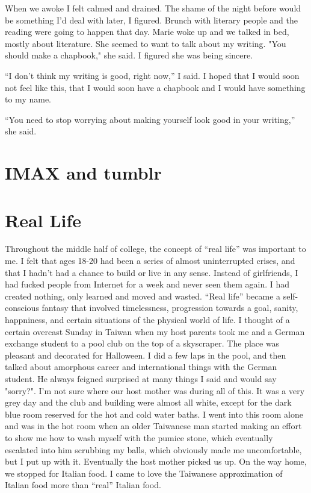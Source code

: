 \documentclass[12pt]{article}
\begin{document}
When we awoke I felt calmed and drained.  The shame of the night before would be
something I'd deal with later, I figured.  Brunch with literary people and the
reading were going to happen that day.  Marie woke up and we talked in bed,
mostly about literature.  She seemed to want to talk about my writing.  "You
should make a chapbook," she said.  I figured she was being sincere.  

``I don't think my writing is good, right now,'' I said.  I hoped that I would
soon not feel like this, that I would soon have a chapbook and I would have
something to my name.

``You need to stop worrying about making yourself look good in your writing,'' she
said.

\section{IMAX and tumblr} 


\section{Real Life} 

Throughout the middle half of college, the concept of ``real life'' was
important to me.  I felt that ages 18-20 had been a series of almost
uninterrupted crises, and that I hadn't had a chance to build or live in any
sense.  Instead of girlfriends, I had fucked people from Internet for a week and
never seen them again.  I had created nothing, only learned and moved and
wasted.  ``Real life'' became a self-conscious fantasy that involved
timelessness, progression towards a goal, sanity, happniness, and certain
situations of the physical world of life.  I thought of a certain overcast
Sunday in Taiwan when my host parents took me and a German exchange student to a
pool club on the top of a skyscraper.  The place was pleasant and decorated for
Halloween.  I did a few laps in the pool, and then talked about amorphous career
and international things with the German student.  He always feigned surprised
at many things I said and would say "sorry?".  I'm not sure where our host
mother was during all of this.  It was a very grey day and the club and building
were almost all white, except for the dark blue room reserved for the hot and
cold water baths.  I went into this room alone and was in the hot room when an
older Taiwanese man started making an effort to show me how to wash myself with
the pumice stone, which eventually escalated into him scrubbing my balls, which
obviously made me uncomfortable, but I put up with it.  Eventually the host
mother picked us up.  On the way home, we stopped for Italian food.  I came to
love the Taiwanese approximation of Italian food more than ``real'' Italian
food.
\end{document}
